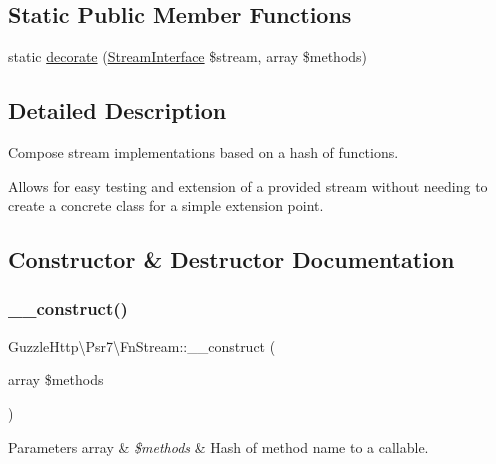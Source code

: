 \subsection*{Static Public Member Functions}
\begin{DoxyCompactItemize}
\item 
static \hyperlink{classGuzzleHttp_1_1Psr7_1_1FnStream_a905abb8520517f72c78a247bea38a210}{decorate} (\hyperlink{interfacePsr_1_1Http_1_1Message_1_1StreamInterface}{Stream\+Interface} \$stream, array \$methods)
\end{DoxyCompactItemize}


\subsection{Detailed Description}
Compose stream implementations based on a hash of functions.

Allows for easy testing and extension of a provided stream without needing to create a concrete class for a simple extension point. 

\subsection{Constructor \& Destructor Documentation}
\mbox{\label{classGuzzleHttp_1_1Psr7_1_1FnStream_ab24256dde91f757958e246ed84b8e651}} 
\subsubsection{\texorpdfstring{\+\_\+\+\_\+construct()}{\_\_construct()}}
{\footnotesize\ttfamily Guzzle\+Http\textbackslash{}\+Psr7\textbackslash{}\+Fn\+Stream\+::\+\_\+\+\_\+construct (\begin{DoxyParamCaption}\item[{array}]{\$methods }\end{DoxyParamCaption})}


\begin{DoxyParams}[1]{Parameters}
array & {\em \$methods} & Hash of method name to a callable. \\
\hline
\end{DoxyParams}
\mbox{\label{classGuzzleHttp_1_1Psr7_1_1FnStream_a92bd0f82b4b67f59914c29018bd29346}} 
